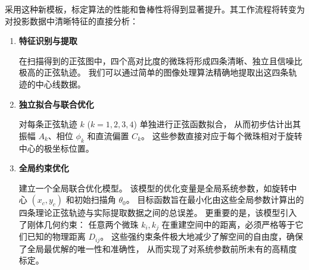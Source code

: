 采用这种新模板，标定算法的性能和鲁棒性将得到显著提升。其工作流程将转变为对投影数据中清晰特征的直接分析：
\begin{enumerate}[label=(\arabic*), left=0.5em]
    \item \textbf{特征识别与提取} \par
    在扫描得到的正弦图中，四个高对比度的微珠将形成四条清晰、独立且信噪比极高的正弦轨迹。
    我们可以通过简单的图像处理算法精确地提取出这四条轨迹的中心线数据。
    \item \textbf{独立拟合与联合优化} \par
    对每条正弦轨迹 $k$ ($k=1,2,3,4$) 单独进行正弦函数拟合，
    从而初步估计出其振幅 $A_k$、相位 $\phi_k$ 和直流偏置 $C_k$。
    这些参数直接对应于每个微珠相对于旋转中心的极坐标位置。
    \item \textbf{全局约束优化} \par
    建立一个全局联合优化模型。
    该模型的优化变量是全局系统参数，如旋转中心 $(x_c, y_c)$ 和初始扫描角 $\theta_0$。
    目标函数旨在最小化由这些全局参数计算出的四条理论正弦轨迹与实际提取数据之间的总误差。
    更重要的是，该模型引入了刚体几何约束：
    任意两个微珠 $k_i, k_j$ 在重建空间中的距离，必须严格等于它们已知的物理距离 $D_{ij}$。
    这些强约束条件极大地减少了解空间的自由度，确保了全局最优解的唯一性和准确性，
    从而实现了对系统参数前所未有的高精度标定。
\end{enumerate}